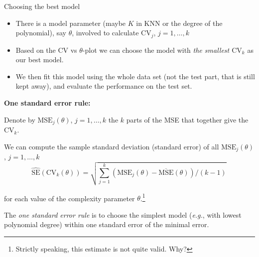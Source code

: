 \documentclass[
  10pt,
  ignorenonframetext,
]{beamer}
\providecommand{\tightlist}{%
  \setlength{\itemsep}{0pt}\setlength{\parskip}{0pt}}
\begin{document}
\begin{frame}
\begin{block}{Choosing the best model}
\protect\hypertarget{choosing-the-best-model}{}
\(~\)

\begin{itemize}
\tightlist
\item
  There is a model parameter (maybe \(K\) in KNN or the degree of the
  polynomial), say \(\theta\), involved to calculate \(\text{CV}_j\),
  \(j=1,\ldots, k\)
\end{itemize}

\vspace{2mm}

\begin{itemize}
\tightlist
\item
  Based on the CV vs \(\theta\)-plot we can choose the model with
  \emph{the smallest \({\text{CV}_k}\)} as our best model.
\end{itemize}

\vspace{2mm}

\begin{itemize}
\tightlist
\item
  We then fit this model using the whole data set (not the test part,
  that is still kept away), and evaluate the performance on the test
  set.
\end{itemize}
\end{block}
\end{frame}

\begin{frame}
\textbf{One standard error rule:}

Denote by \(\text{MSE}_j(\theta)\), \(j=1,\ldots, k\) the \(k\) parts of
the MSE that together give the \(\text{CV}_k\).

We can compute the sample standard deviation (standard error) of all
\(\text{MSE}_j(\theta)\), \(j=1,\ldots, k\)
\[\hat{\text{SE}}(\text{CV}_k(\theta))= \sqrt{\sum_{j=1}^k (\text{MSE}_j(\theta) - \overline{\text{MSE}}(\theta))/(k-1)} \, \]

for each value of the complexity parameter
\(\theta\).\footnote{Strictly speaking, this estimate is not quite valid. Why?}

The \emph{one standard error rule} is to choose the simplest model
(\emph{e.g.}, with lowest polynomial degree) within one standard error
of the minimal error.
\end{frame}
\end{document}
